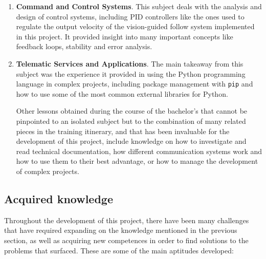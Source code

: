 \begin{enumerate}
    \item \textbf{Command and Control Systems}. This subject deals with the analysis and design of control systems, including PID controllers like the ones used to regulate the output velocity of the vision-guided follow system implemented in this project. It provided insight into many important concepts like feedback loops, stability and error analysis.
    
    \item \textbf{Telematic Services and Applications}. The main takeaway from this subject was the experience it provided in using the Python programming language in complex projects, including package management with \texttt{pip} and how to use some of the most common external libraries for Python.
    
    Other lessons obtained during the course of the bachelor's that cannot be pinpointed to an isolated subject but to the combination of many related pieces in the training itinerary, and that has been invaluable for the development of this project, include knowledge on how to investigate and read technical documentation, how different communication systems work and how to use them to their best advantage, or how to manage the development of complex projects.
\end{enumerate}


\subsection{Acquired knowledge}

Throughout the development of this project, there have been many challenges that have required expanding on the knowledge mentioned in the previous section, as well as acquiring new competences in order to find solutions to the problems that surfaced.
These are some of the main aptitudes developed:

